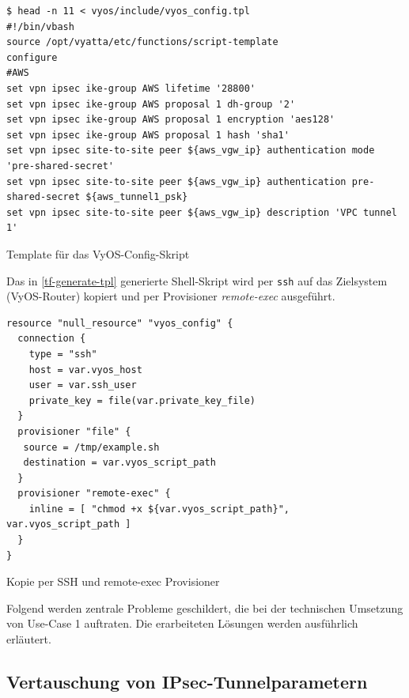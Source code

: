 \begin{listing}[h]
\begin{verbatim}
$ head -n 11 < vyos/include/vyos_config.tpl
#!/bin/vbash
source /opt/vyatta/etc/functions/script-template
configure
#AWS
set vpn ipsec ike-group AWS lifetime '28800'
set vpn ipsec ike-group AWS proposal 1 dh-group '2'
set vpn ipsec ike-group AWS proposal 1 encryption 'aes128'
set vpn ipsec ike-group AWS proposal 1 hash 'sha1'
set vpn ipsec site-to-site peer ${aws_vgw_ip} authentication mode 'pre-shared-secret'
set vpn ipsec site-to-site peer ${aws_vgw_ip} authentication pre-shared-secret ${aws_tunnel1_psk}
set vpn ipsec site-to-site peer ${aws_vgw_ip} description 'VPC tunnel 1'

\end{verbatim}
\caption{Template für das VyOS-Config-Skript}
\label{tf-generate-tpl}
\end{listing}\FloatBarrier

Das in \ref{tf-generate-tpl} generierte Shell-Skript wird per \texttt{ssh} auf das Zielsystem (VyOS-Router) kopiert und per Provisioner \textit{remote-exec} ausgeführt.
\begin{listing}[h]
\begin{verbatim}
resource "null_resource" "vyos_config" {
  connection {
    type = "ssh"
    host = var.vyos_host
    user = var.ssh_user
    private_key = file(var.private_key_file)
  }
  provisioner "file" {
   source = /tmp/example.sh
   destination = var.vyos_script_path
  }
  provisioner "remote-exec" {
    inline = [ "chmod +x ${var.vyos_script_path}", var.vyos_script_path ]
  }
}

\end{verbatim}
\caption{Kopie per SSH und remote-exec Provisioner}
\label{tf-copy-tpl}
\end{listing}\FloatBarrier
\newpage
Folgend werden zentrale Probleme geschildert, die bei der technischen Umsetzung von Use-Case 1 auftraten. Die erarbeiteten Lösungen werden ausführlich erläutert.

\newpage
\subsection{Vertauschung von IPsec-Tunnelparametern}\label{xml-tunnel-parameters}

